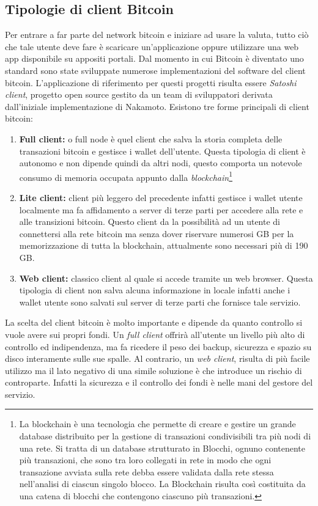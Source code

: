 \subsection*{Tipologie di client Bitcoin}
Per entrare a far parte del network bitcoin e iniziare ad usare la valuta, tutto ciò che tale utente deve fare è scaricare un'applicazione oppure utilizzare una web app disponibile su appositi portali. Dal momento in cui Bitcoin è diventato uno standard sono state sviluppate numerose implementazioni del software del client bitcoin. L'applicazione di riferimento per questi progetti risulta essere \textit{Satoshi client}, progetto open source gestito da un team di sviluppatori derivata dall'iniziale implementazione di Nakamoto. Esistono tre forme principali di client bitcoin:
\begin{enumerate}
	\item \textbf{Full client:} o full node è quel client che salva la storia completa delle transazioni bitcoin e gestisce i wallet dell'utente. Questa tipologia di client è autonomo e non dipende quindi da altri nodi, questo comporta un notevole consumo di memoria occupata appunto dalla \textit{blockchain}\footnote{La blockchain è una tecnologia che permette di creare e gestire un grande database distribuito per la gestione di transazioni condivisibili tra più nodi di una rete. Si tratta di un database strutturato in Blocchi, ognuno contenente più transazioni, che sono tra loro collegati in rete in modo che ogni transazione avviata sulla rete debba essere validata dalla rete stessa nell'analisi di ciascun singolo blocco. La Blockchain risulta così costituita da una catena di blocchi che contengono ciascuno più transazioni.}
	\item \textbf{Lite client:} client più leggero del precedente infatti gestisce i wallet utente localmente ma fa affidamento a server di terze parti per accedere alla rete e alle transizioni bitcoin. Questo client da la possibilità ad un utente di connettersi alla rete bitcoin ma senza dover riservare numerosi GB per la memorizzazione di tutta la blockchain, attualmente sono necessari più di 190 GB.
	\item \textbf{Web client:} classico client al quale si accede tramite un web browser. Questa tipologia di client non salva alcuna informazione in locale infatti anche i wallet utente sono salvati sul server di terze parti che fornisce tale servizio.
\end{enumerate}
La scelta del client bitcoin è molto importante e dipende da quanto controllo si vuole avere sui propri fondi. Un \textit{full client} offrirà all'utente un livello più alto di controllo ed indipendenza, ma fa ricedere il peso dei backup, sicurezza e spazio su disco interamente sulle sue spalle. Al contrario, un \textit{web client}, risulta di più facile utilizzo ma il lato negativo di una simile soluzione è che introduce un rischio di controparte. Infatti la sicurezza e il controllo dei fondi è nelle mani del gestore del servizio. 

